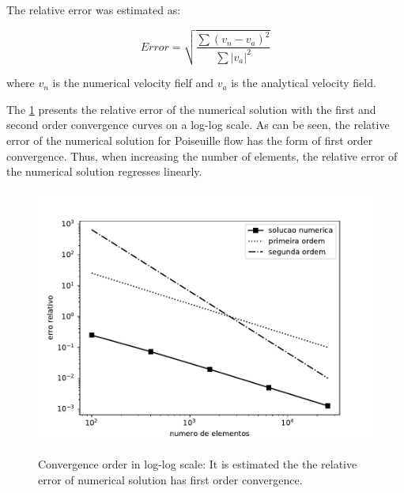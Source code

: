 \noindent
\medskip
The relative error was estimated as:

\begin{equation}
 \mathit{Error} = \sqrt{\frac{\sum{(v_{n} - v_{a})^{2} }}{\sum |v_{a}|^{2} }}
\end{equation}

\noindent
where $v_{n}$ is the numerical velocity fielf and
$v_{a}$ is the analytical velocity field.

\bigskip
The \ref{ordem de convergencia poiseuille} presents the relative error 
of the numerical solution with the first and second order convergence 
curves on a log-log scale. As can be seen, the relative error of 
the numerical solution for Poiseuille flow has the form of 
first order convergence. Thus, when increasing the number of elements, 
the relative error of the numerical solution regresses linearly.

\begin{figure}[H]
     \centering
     \includegraphics[scale=1]{./02_chaps/cap_validation/figure/poiseuille_error.pdf}\\
     \medskip
     \caption{Convergence order in log-log scale:
It is estimated the the relative error of numerical solution has
first order convergence.}
     \label{ordem de convergencia poiseuille}
\end{figure}


